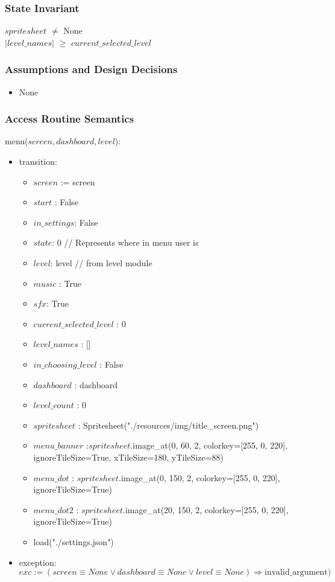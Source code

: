 \documentclass[12pt]{article}
\begin{document}
\subsubsection* {State Invariant}

$spritesheet$ $\neq$ None \\
$|level\_names|$ $\geq$  $current\_selected\_level$

\subsubsection* {Assumptions and Design Decisions}

\begin{itemize}
    \item None
\end{itemize}

\subsubsection *{Access Routine Semantics}

\noindent menu($\mathit{screen, dashboard, level}$):
\begin{itemize}
\item transition:
\begin{itemize}
    \item $screen$ := screen
    \item $start$ : False
    \item $in\_settings$: False
    \item $state$: 0 // Represents where in menu user is
    \item $level$: level // from level module
    \item $music$ : True
    \item $sfx$: True
    \item $current\_selected\_level$ : 0
    \item $level\_names$ : []
    \item $in\_choosing\_level$ : False
    \item $dashboard$ : dashboard
    \item $level\_count$ : 0
    \item $spritesheet$ : Spritesheet("./resources/img/title\_screen.png")
    \item $menu\_banner$ :$spritesheet$.image\_at(0, 60, 2, colorkey=[255, 0, 220], ignoreTileSize=True, xTileSize=180, yTileSize=88)
    \item $menu\_dot$ : $spritesheet$.image\_at(0, 150, 2, colorkey=[255, 0, 220], ignoreTileSize=True)
    \item $menu\_dot2$ : $spritesheet$.image\_at(20, 150, 2, colorkey=[255, 0, 220], ignoreTileSize=True)
    \item load\settings("./settings.json")
\end{itemize}
\item exception: $exc := (screen \equiv None \lor dashboard \equiv None \lor level \equiv None) \Rightarrow \text{invalid\_argument})$
\end{itemize}
\end{document}
